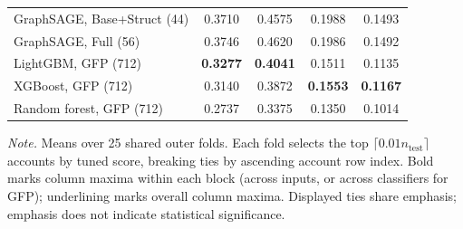 \begin{table}[htbp]
\begin{threeparttable}
\begin{tabular}{lcccc}
GraphSAGE, Base+Struct (44) & 0.3710 & 0.4575 & 0.1988 & 0.1493 \\
GraphSAGE, Full (56) & 0.3746 & 0.4620 & 0.1986 & 0.1492 \\
\addlinespace
LightGBM, GFP (712) & \textbf{0.3277} & \textbf{0.4041} & 0.1511 & 0.1135 \\
XGBoost, GFP (712) & 0.3140 & 0.3872 & \textbf{0.1553} & \textbf{0.1167} \\
Random forest, GFP (712) & 0.2737 & 0.3375 & 0.1350 & 0.1014 \\
\bottomrule
\end{tabular}
\begin{tablenotes}[flushleft]
\footnotesize
\setlength{\labelsep}{0pt}\item[] \textit{Note.} Means over 25 shared outer folds. Each fold selects the top $\lceil0.01n_{\mathrm{test}}\rceil$ accounts by tuned score, breaking ties by ascending account row index. Bold marks column maxima within each block (across inputs, or across classifiers for GFP); underlining marks overall column maxima. Displayed ties share emphasis; emphasis does not indicate statistical significance.
\end{tablenotes}
\end{threeparttable}
\end{table}
